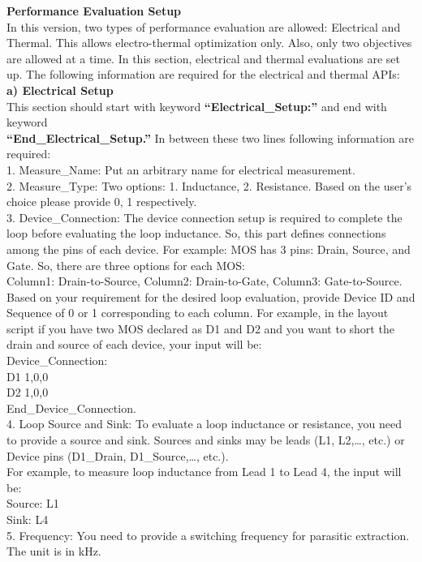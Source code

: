 \documentclass[11pt]{article}
\begin{document}
\textbf{Performance Evaluation Setup}\\
In this version, two types of performance evaluation are allowed: Electrical and Thermal. This allows electro-thermal optimization only. Also, only two objectives are allowed at a time. In this section, electrical and thermal evaluations are set up. The following information are required for the electrical and thermal APIs:\\
\textbf{a) Electrical Setup}\\
This section should start with keyword \textbf{“Electrical\_Setup:”} and end with keyword\\
\textbf{“End\_Electrical\_Setup.”} In between these two lines following information are required:\\
1. Measure\_Name: Put an arbitrary name for electrical measurement.\\
2. Measure\_Type: Two options: 1. Inductance, 2. Resistance. Based on the user's choice please provide 0, 1 respectively.\\
3. Device\_Connection: The device connection setup is required to complete the loop before evaluating the loop inductance. So, this part defines connections among the pins of each device. For example: MOS has 3 pins: Drain, Source, and Gate. So, there are three options for each MOS:\\
Column1: Drain-to-Source, Column2: Drain-to-Gate, Column3: Gate-to-Source.\\
Based on your requirement for the desired loop evaluation, provide Device ID and Sequence of 0 or 1 corresponding to each column. For example, in the layout script if you have two MOS declared as D1 and D2 and you want to short the drain and source of each device, your input will be:\\
Device\_Connection:\\
D1  1,0,0\\
D2  1,0,0\\
End\_Device\_Connection.\\
4. Loop Source and Sink: To evaluate a loop inductance or resistance, you need to provide a source and sink. Sources and sinks may be leads (L1, L2,…, etc.) or Device pins (D1\_Drain, D1\_Source,…, etc.).\\
For example, to measure loop inductance from Lead 1 to Lead 4, the input will be:\\ 
Source: L1\\
Sink: L4\\
5. Frequency: You need to provide a switching frequency for parasitic extraction. The unit is in kHz.\\
\end{document}
